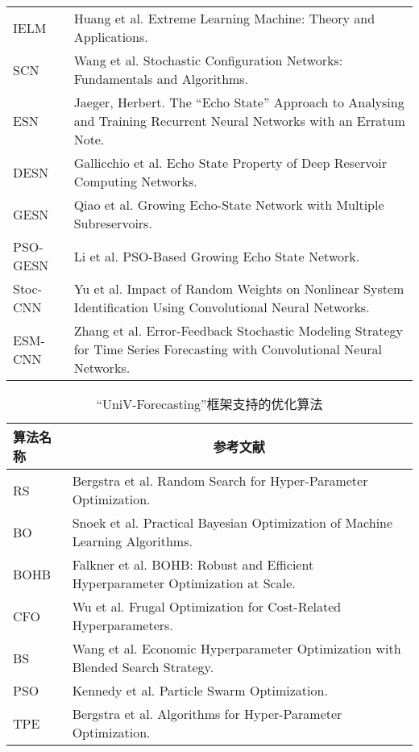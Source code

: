 \begin{table}[t!]
\begin{tabularx}{\textwidth}{lX}
    IELM          &  Huang et al. {Extreme Learning Machine: {{Theory}} and Applications}\cite{huangExtreme2006}.    \\
    SCN      &   Wang et al. Stochastic Configuration Networks: Fundamentals and Algorithms\cite{wang2017stochastic}.   \\
    ESN   &   Jaeger, Herbert. {The “Echo State” Approach to Analysing and Training Recurrent Neural Networks with an Erratum Note}\cite{jaegerEcho2001}.  \\
    DESN   &   Gallicchio et al. {Echo State Property of Deep Reservoir Computing Networks}\cite{gallicchioEcho2017}.   \\
    GESN   &  Qiao et al. {Growing Echo-State Network with Multiple Subreservoirs}\cite{qiaoGrowing2017}.   \\
    PSO-GESN   &   Li et al. {PSO}-Based Growing Echo State Network\cite{liPSObased2019}.   \\
    Stoc-CNN &   Yu et al. {Impact of Random Weights on Nonlinear System Identification Using Convolutional Neural Networks}\cite{yuImpact2019}.  \\
    ESM-CNN &    Zhang et al. {Error-Feedback Stochastic Modeling Strategy for Time Series Forecasting with Convolutional Neural Networks}\cite{zhangErrorfeedback2021}.  \\
\bottomrule
    \end{tabularx}
    \end{table}


    \begin{table}[t!]
        \centering
        \footnotesize
        \caption{“UniV-Forecasting”框架支持的优化算法\label{tab:ch.univ.optim}}
        \scriptsize
        \begin{tabularx}{\textwidth}{lX}
        \toprule
        算法名称      & \multicolumn{1}{c}{参考文献} \\ \midrule
        RS     &   Bergstra et al. Random Search for Hyper-Parameter Optimization\cite{bergstraRandom2012}.   \\ 
        BO     &   Snoek et al. Practical Bayesian Optimization of Machine Learning Algorithms\cite{snoekPractical2012}.   \\ 
        BOHB     &   Falkner et al. {BOHB: Robust and Efficient Hyperparameter Optimization at Scale}\cite{falknerBOHB2018}.   \\ 
        CFO     &   Wu et al. {Frugal Optimization for Cost-Related Hyperparameters}\cite{wuFrugal2021}.   \\ 
        BS     &   Wang et al. {Economic Hyperparameter Optimization with Blended Search Strategy}\cite{wangEconomic2020}.   \\ 
        PSO     &   Kennedy et al. {Particle Swarm Optimization}\cite{kennedyParticle1995}.   \\         
        TPE     &   Bergstra et al. {Algorithms for Hyper-Parameter Optimization}\cite{bergstraAlgorithms2011}.   \\     
    \bottomrule
        \end{tabularx}
        \end{table}